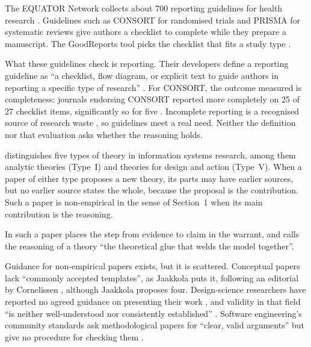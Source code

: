 \documentclass[12pt, a4paper]{article}
\begin{document}
The EQUATOR Network collects about 700 reporting guidelines for
health research .  Guidelines such as CONSORT for
randomised trials and PRISMA for systematic reviews \citep{page2021}
give authors a checklist to complete while they prepare a manuscript.  The GoodReports tool picks the checklist that fits a study type
\citep{struthers2021}.

What these guidelines check is reporting.  Their developers define a
reporting guideline as ``a checklist, flow diagram, or explicit text to
guide authors in reporting a specific type of research''
\citep{moher2010}.  For CONSORT, the outcome measured is completeness: journals endorsing CONSORT reported more completely on 25
of 27 checklist items, significantly so for five \citep{turner2012}.
Incomplete reporting is a recognised source of research waste
\citep{glasziou2014}, so guidelines meet a real need.  Neither the definition nor that evaluation asks whether the reasoning holds.

\citet{gregor2006} distinguishes five types of theory in
information systems research, among them analytic theories (Type~I)
and theories for design and action (Type~V).  When a paper of either
type proposes a new theory, its parts may have earlier sources, but no
earlier source states the whole, because the proposal is the
contribution.  Such a paper is non-empirical in the sense of
Section~1 when its main contribution is the reasoning.

In such a paper \citet{toulmin2003} places the step from evidence to
claim in the warrant, and \citet[p.~491]{whetten1989} calls the
reasoning of a theory ``the theoretical glue that welds the model
together''.

Guidance for non-empirical papers exists, but it is scattered.
Conceptual papers lack ``commonly accepted templates'', as Jaakkola
puts it, following an editorial by Cornelissen \citep[p.~18]{jaakkola2020}, although Jaakkola proposes four.
Design-science researchers have reported no agreed guidance on
presenting their work \citep{gregor2013,dinter2015}, and validity in
that field ``is neither well-understood nor consistently established''
\citep{larsen2025}.  Software engineering's community standards ask
methodological papers for ``clear, valid arguments'' but give no
procedure for checking them \citep{ralph2020}.
\end{document}
